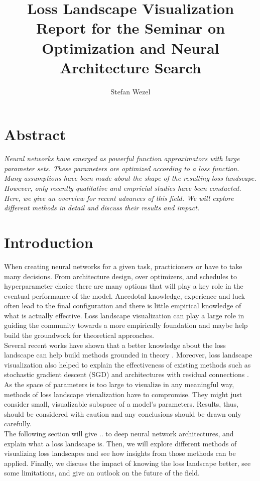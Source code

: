 \documentclass[a4paper]{scrartcl}
\title{\textbf{Loss Landscape Visualization}\\\small Report for the Seminar on Optimization and Neural Architecture Search}
\author{Stefan Wezel}
\begin{document}
	
	
	

\maketitle



\section*{Abstract}
\textit{Neural networks have emerged as powerful function approximators with large parameter sets. These parameters are optimized according to a loss function. Many assumptions have been made about the shape of the resulting loss landscape. However, only recently qualitative and empricial studies have been conducted. Here, we give an overview for recent advances of this field. We will explore different methods in detail and discuss their results and impact.}



\section*{Introduction}
When creating neural networks for a given task, practicioners or have to take many decisions. From architecture design, over optimizers, and schedules to hyperparameter choice there are many options that will play a key role in the eventual performance of the model. Anecdotal knowledge, experience and luck often lead to the final configuration and there is little empirical knowledge of what is actually effective. Loss landscape visualization can play a large role in guiding the community towards a more empirically foundation and maybe help build the groundwork for theoretical approaches.\\
Several recent works have shown that a better knowledge about the loss landscape can help build methods grounded in theory \cite{mutschler2020parabolic, chaudhari2019entropy}. Moreover, loss landscape visualization also helped to explain the effectiveness of existing methods such as stochastic gradient descent (SGD) \cite{robbins1951stochastic, xing2018walk} and architectures with residual connections \cite{he2016deep, li2017visualizing}.\\
As the space of parameters is too large to visualize in any meaningful way, methods of loss landscape visualization have to compromise. They might just consider small, visualizable subspace of a model's parameters. Results, thus, should be considered with caution and any conclusions should be drawn only carefully.\\
The following section will give .. to deep neural network architectures, and explain what a loss landscape is. Then, we will explore different methods of visualizing loss landscapes and see how insights from those methods can be applied. Finally, we discuss the impact of knowing the loss landscape better, see some limitations, and give an outlook on the future of the field.
\end{document}

